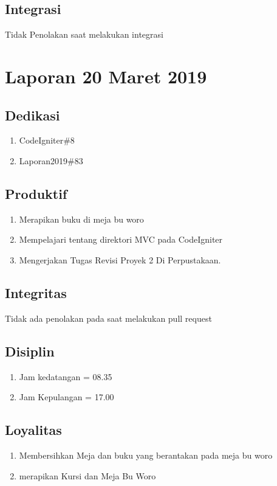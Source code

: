 \subsection{Integrasi}
Tidak Penolakan saat melakukan integrasi

\section{Laporan 20 Maret 2019}
\subsection{Dedikasi}
\begin{enumerate}
\item CodeIgniter\#8
\item Laporan2019\#83
\end{enumerate}
\subsection{Produktif}
\begin{enumerate}
\item Merapikan buku di meja bu woro
\item Mempelajari tentang direktori MVC pada CodeIgniter
\item Mengerjakan Tugas Revisi Proyek 2 Di Perpustakaan.
\end{enumerate}
\subsection{Integritas}
Tidak ada penolakan pada saat melakukan pull request
\subsection{Disiplin}
\begin{enumerate}
\item Jam kedatangan =  08.35 
\item Jam Kepulangan = 17.00
\end{enumerate}
\subsection{Loyalitas}
\begin{enumerate}
\item Membersihkan Meja dan buku yang berantakan pada meja bu woro
\item merapikan Kursi dan Meja Bu Woro
\end{enumerate}

